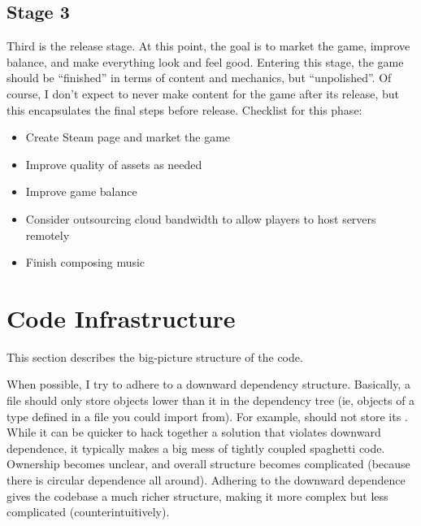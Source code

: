 \documentclass{article}
\begin{document}
\subsection{Stage 3}
Third is the release stage. At this point, the goal is to market the game, improve balance,
and make everything look and feel good. Entering this stage, the game should be ``finished'' in
terms of content and mechanics, but ``unpolished''. Of course, I don't expect to never make
content for the game after its release, but this encapsulates the final steps before release.
Checklist for this phase:
\begin{itemize}
    \item Create Steam page and market the game
    \item Improve quality of assets as needed
    \item Improve game balance
    \item Consider outsourcing cloud bandwidth to allow players to host servers remotely
    \item Finish composing music
\end{itemize}

\section{Code Infrastructure}
This section describes the big-picture structure of the code.

When possible, I try to adhere to a downward dependency structure. Basically, a file
should only store objects lower than it in the dependency tree (ie, objects of a type defined
in a file you could import from). For example,  should not store its
. While it can be quicker to hack together a solution that violates downward
dependence, it typically makes a big mess of tightly coupled spaghetti code. Ownership becomes unclear,
and overall structure becomes complicated (because there is circular dependence all around). Adhering
to the downward dependence gives the codebase a much richer structure, making it more complex but less
complicated (counterintuitively).
\end{document}
